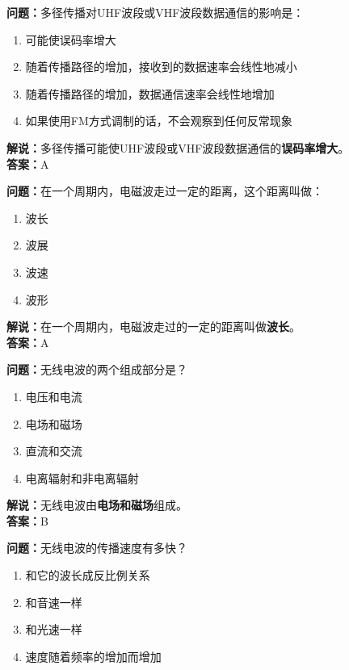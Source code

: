 \documentclass{ctexbook}
\begin{document}
\bigskip


\noindent\textbf{问题：}多径传播对UHF波段或VHF波段数据通信的影响是：

\begin{enumerate}[label=\Alph*), leftmargin=3em]
	\item 可能使误码率增大
	\item 随着传播路径的增加，接收到的数据速率会线性地减小
	\item 随着传播路径的增加，数据通信速率会线性地增加
	\item 如果使用FM方式调制的话，不会观察到任何反常现象
\end{enumerate}

\noindent\textbf{解说：}多径传播可能使UHF波段或VHF波段数据通信的\textbf{误码率增大}。\\\noindent\textbf{答案：}A


\bigskip


\noindent\textbf{问题：}在一个周期内，电磁波走过一定的距离，这个距离叫做：

\begin{enumerate}[label=\Alph*), leftmargin=3em]
	\item 波长
	\item 波展
	\item 波速
	\item 波形
\end{enumerate}

\noindent\textbf{解说：}在一个周期内，电磁波走过的一定的距离叫做\textbf{波长}。\\\noindent\textbf{答案：}A


\bigskip


\noindent\textbf{问题：}无线电波的两个组成部分是？

\begin{enumerate}[label=\Alph*), leftmargin=3em]
	\item 电压和电流
	\item 电场和磁场
	\item 直流和交流
	\item 电离辐射和非电离辐射
\end{enumerate}

\noindent\textbf{解说：}无线电波由\textbf{电场和磁场}组成。\\\noindent\textbf{答案：}B


\bigskip


\noindent\textbf{问题：}无线电波的传播速度有多快？

\begin{enumerate}[label=\Alph*), leftmargin=3em]
	\item 和它的波长成反比例关系
	\item 和音速一样
	\item 和光速一样
	\item 速度随着频率的增加而增加
\end{enumerate}
\end{document}

